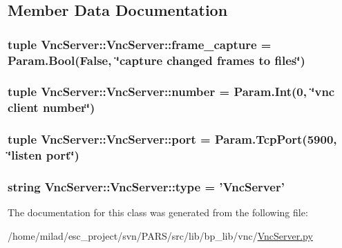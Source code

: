 \subsection{Member Data Documentation}
\hypertarget{classVncServer_1_1VncServer_ae12ce7ac563c8d2605be5bb314695293}{
\subsubsection[{frame\_\-capture}]{\setlength{\rightskip}{0pt plus 5cm}tuple {\bf VncServer::VncServer::frame\_\-capture} = {\bf Param.Bool}(False, \char`\"{}capture changed frames to files\char`\"{})}}
\label{classVncServer_1_1VncServer_ae12ce7ac563c8d2605be5bb314695293}
\hypertarget{classVncServer_1_1VncServer_a04d2358b5b6b9071d763987c65ffc42a}{
\subsubsection[{number}]{\setlength{\rightskip}{0pt plus 5cm}tuple {\bf VncServer::VncServer::number} = Param.Int(0, \char`\"{}vnc client {\bf number}\char`\"{})}}
\label{classVncServer_1_1VncServer_a04d2358b5b6b9071d763987c65ffc42a}
\hypertarget{classVncServer_1_1VncServer_acd53d0ea3e4e1a0f99372c165be452c5}{
\subsubsection[{port}]{\setlength{\rightskip}{0pt plus 5cm}tuple {\bf VncServer::VncServer::port} = Param.TcpPort(5900, \char`\"{}listen {\bf port}\char`\"{})}}
\label{classVncServer_1_1VncServer_acd53d0ea3e4e1a0f99372c165be452c5}
\hypertarget{classVncServer_1_1VncServer_a18b1167e6c0414f5bbe76116e29e81c8}{
\subsubsection[{type}]{\setlength{\rightskip}{0pt plus 5cm}string {\bf VncServer::VncServer::type} = '{\bf VncServer}'}}
\label{classVncServer_1_1VncServer_a18b1167e6c0414f5bbe76116e29e81c8}


The documentation for this class was generated from the following file:\begin{DoxyCompactItemize}
\item 
/home/milad/esc\_\-project/svn/PARS/src/lib/bp\_\-lib/vnc/\hyperlink{VncServer_8py}{VncServer.py}\end{DoxyCompactItemize}
